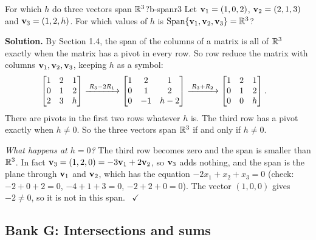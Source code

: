 \documentclass[11pt]{article}
\begin{document}
\begin{exmp}{For which $h$ do three vectors span $\mathbb{R}^3$?}{b-spanr3}
Let $\mathbf{v}_1=(1,0,2)$, $\mathbf{v}_2=(2,1,3)$ and $\mathbf{v}_3=(1,2,h)$. For which values of $h$ is $\operatorname{Span}\{\mathbf{v}_1,\mathbf{v}_2,\mathbf{v}_3\}=\mathbb{R}^3$?

\textbf{Solution.} By Section 1.4, the span of the columns of a matrix is all of $\mathbb{R}^3$ exactly when the matrix has a pivot in every row. So row reduce the matrix with columns $\mathbf{v}_1,\mathbf{v}_2,\mathbf{v}_3$, keeping $h$ as a symbol:
\begin{align*}
\begin{bmatrix}1&2&1\\0&1&2\\2&3&h\end{bmatrix}
&\xrightarrow{\;R_3-2R_1\;}
\begin{bmatrix}1&2&1\\0&1&2\\0&-1&h-2\end{bmatrix}
\xrightarrow{\;R_3+R_2\;}
\begin{bmatrix}1&2&1\\0&1&2\\0&0&h\end{bmatrix}.
\end{align*}
There are pivots in the first two rows whatever $h$ is. The third row has a pivot exactly when $h\neq0$. So the three vectors span $\mathbb{R}^3$ if and only if $h\neq0$.

\emph{What happens at $h=0$?} The third row becomes zero and the span is smaller than $\mathbb{R}^3$. In fact $\mathbf{v}_3=(1,2,0)=-3\mathbf{v}_1+2\mathbf{v}_2$, so $\mathbf{v}_3$ adds nothing, and the span is the plane through $\mathbf{v}_1$ and $\mathbf{v}_2$, which has the equation $-2x_1+x_2+x_3=0$ (check: $-2+0+2=0$, $-4+1+3=0$, $-2+2+0=0$). The vector $(1,0,0)$ gives $-2\neq0$, so it is not in this span. \ $\checkmark$
\end{exmp}

\subsection*{Bank G: Intersections and sums}
\end{document}
